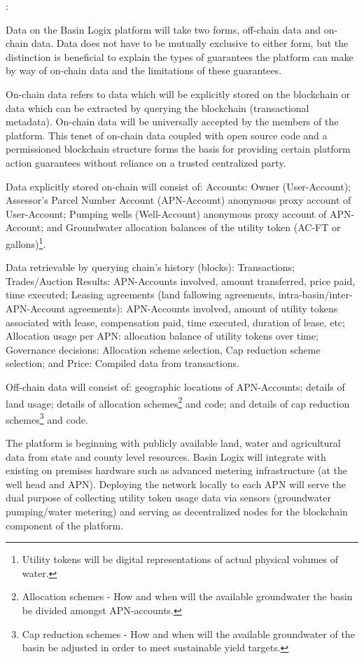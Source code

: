 \documentclass{tufte-handout}
\begin{document}
:

Data on the Basin Logix platform will take two forms, off-chain data and on-chain data. Data does not have to be mutually exclusive to either form, but the distinction is beneficial to explain the types of guarantees the platform can make by way of on-chain data and the limitations of these guarantees. 

On-chain data refers to data which will be explicitly stored on the blockchain or data which can be extracted by querying the blockchain (transactional metadata). On-chain data will be universally accepted by the members of the platform. This tenet of on-chain data coupled with open source code and a permissioned blockchain structure forms the basis for providing certain platform action guarantees without reliance on a trusted centralized party.

Data explicitly stored on-chain will consist of: Accounts: Owner (User-Account); Assessor's Parcel Number Account (APN-Account) anonymous proxy account of User-Account; Pumping wells (Well-Account) anonymous proxy account of APN-Account; and Groundwater allocation balances of the utility token (AC-FT or gallons)\footnote{Utility tokens will be digital representations of actual physical volumes of water.}. 

Data retrievable by querying chain's history (blocks): Transactions; Trades/Auction Results: APN-Accounts involved, amount transferred, price paid, time executed; Leasing agreements (land fallowing agreements, intra-basin/inter-APN-Account agreements): APN-Accounts involved, amount of utility tokens associated with lease, compensation paid, time executed, duration of lease, etc; Allocation usage per APN: allocation balance of utility tokens over time; Governance decisions: Allocation scheme selection, Cap reduction scheme selection; and Price: Compiled data from transactions.

Off-chain data will consist of: geographic locations of APN-Accounts; details of land usage; details of allocation schemes\footnote{Allocation schemes - How and when will the available groundwater the basin be divided amongst APN-accounts.} and code; and details of cap reduction schemes\footnote{Cap reduction schemes - How and when will the available groundwater of the basin be adjusted in order to meet sustainable yield targets.} and code.

The platform is beginning with publicly available land, water and agricultural data from state and county level resources. Basin Logix will integrate with existing on premises hardware such as advanced metering infrastructure (at the well head and APN). Deploying the network locally to each APN will serve the dual purpose of collecting utility token usage data via sensors (groundwater pumping/water metering) and serving as decentralized nodes for the blockchain component of the platform. 
\end{document}
